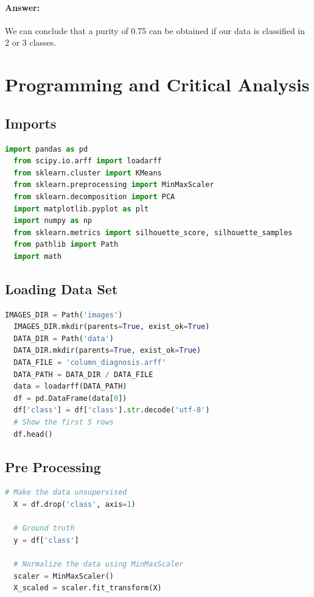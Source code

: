 \documentclass{article}
\begin{document}
\paragraph{Answer:} We can conclude that a purity of 0.75 can be obtained if our data is classified in 2 or 3 classes.

\newpage

\section*{Programming and Critical Analysis}

\subsection*{Imports}

\begin{lstlisting}[language=Python]
  import pandas as pd
  from scipy.io.arff import loadarff
  from sklearn.cluster import KMeans
  from sklearn.preprocessing import MinMaxScaler
  from sklearn.decomposition import PCA
  import matplotlib.pyplot as plt
  import numpy as np
  from sklearn.metrics import silhouette_score, silhouette_samples
  from pathlib import Path
  import math
\end{lstlisting}

\subsection*{Loading Data Set}
\begin{lstlisting}[language=Python]
  IMAGES_DIR = Path('images')
  IMAGES_DIR.mkdir(parents=True, exist_ok=True)
  DATA_DIR = Path('data')
  DATA_DIR.mkdir(parents=True, exist_ok=True)
  DATA_FILE = 'column_diagnosis.arff'
  DATA_PATH = DATA_DIR / DATA_FILE
  data = loadarff(DATA_PATH)
  df = pd.DataFrame(data[0])
  df['class'] = df['class'].str.decode('utf-8')
  # Show the first 5 rows
  df.head()
\end{lstlisting}

\subsection*{Pre Processing}
\begin{lstlisting}[language=Python]
  # Make the data unsupervised
  X = df.drop('class', axis=1)
  
  # Ground truth
  y = df['class']
  
  # Normalize the data using MinMaxScaler
  scaler = MinMaxScaler()
  X_scaled = scaler.fit_transform(X)
\end{lstlisting}
\end{document}
